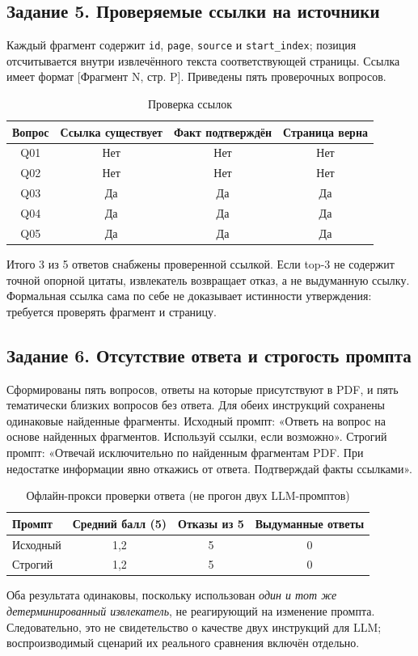 \documentclass[12pt,a4paper]{article}
\begin{document}
\subsection{Задание 5. Проверяемые ссылки на источники}
Каждый фрагмент содержит \texttt{id}, \texttt{page}, \texttt{source} и \texttt{start\_index}; позиция отсчитывается внутри извлечённого текста соответствующей страницы. Ссылка имеет формат [Фрагмент N, стр. P]. Приведены пять проверочных вопросов.
\begin{table}[H]\centering\caption{Проверка ссылок}\begin{tabular}{|c|c|c|c|}\hline
Вопрос & Ссылка существует & Факт подтверждён & Страница верна \\ \hline
Q01 & Нет & Нет & Нет \\ \hline
Q02 & Нет & Нет & Нет \\ \hline
Q03 & Да & Да & Да \\ \hline
Q04 & Да & Да & Да \\ \hline
Q05 & Да & Да & Да \\ \hline
\end{tabular}\end{table}
Итого 3 из 5 ответов снабжены проверенной ссылкой. Если top-3 не содержит точной опорной цитаты, извлекатель возвращает отказ, а не выдуманную ссылку. Формальная ссылка сама по себе не доказывает истинности утверждения: требуется проверять фрагмент и страницу.

\subsection{Задание 6. Отсутствие ответа и строгость промпта}
Сформированы пять вопросов, ответы на которые присутствуют в PDF, и пять тематически близких вопросов без ответа. Для обеих инструкций сохранены одинаковые найденные фрагменты. Исходный промпт: «Ответь на вопрос на основе найденных фрагментов. Используй ссылки, если возможно». Строгий промпт: «Отвечай исключительно по найденным фрагментам PDF. При недостатке информации явно откажись от ответа. Подтверждай факты ссылками».

\begin{table}[H]\centering\caption{Офлайн-прокси проверки ответа (не прогон двух LLM-промптов)}\begin{tabular}{|L{3cm}|c|c|c|}\hline
Промпт & Средний балл (5) & Отказы из 5 & Выдуманные ответы \\ \hline
Исходный & 1,2 & 5 & 0 \\ \hline
Строгий & 1,2 & 5 & 0 \\ \hline
\end{tabular}\end{table}
Оба результата одинаковы, поскольку использован \emph{один и тот же детерминированный извлекатель}, не реагирующий на изменение промпта. Следовательно, это не свидетельство о качестве двух инструкций для LLM; воспроизводимый сценарий их реального сравнения включён отдельно.
\end{document}

